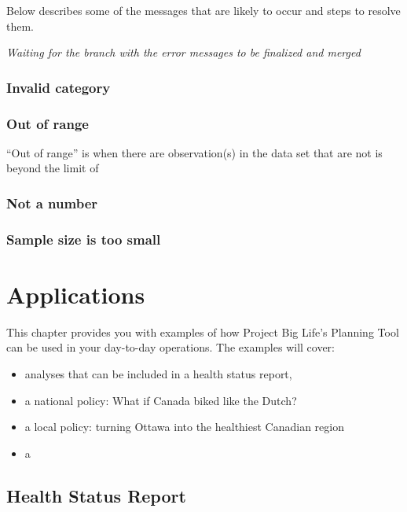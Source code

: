 \documentclass[]{book}
\providecommand{\tightlist}{%
  \setlength{\itemsep}{0pt}\setlength{\parskip}{0pt}}
\begin{document}
Below describes some of the messages that are likely to occur and steps
to resolve them.

\emph{Waiting for the branch with the error messages to be finalized and
merged}

\subsection{Invalid category}\label{invalid-category}

\subsection{Out of range}\label{out-of-range}

``Out of range'' is when there are observation(s) in the data set that
are not is beyond the limit of

\subsection{Not a number}\label{not-a-number}

\subsection{Sample size is too small}\label{sample-size-is-too-small}

\chapter{Applications}\label{applications}

This chapter provides you with examples of how Project Big Life's
Planning Tool can be used in your day-to-day operations. The examples
will cover:

\begin{itemize}
\tightlist
\item
  analyses that can be included in a health status report,
\item
  a national policy: What if Canada biked like the Dutch?
\item
  a local policy: turning Ottawa into the healthiest Canadian region
\item
  a
\end{itemize}

\section{Health Status Report}\label{health-status-report}
\end{document}

